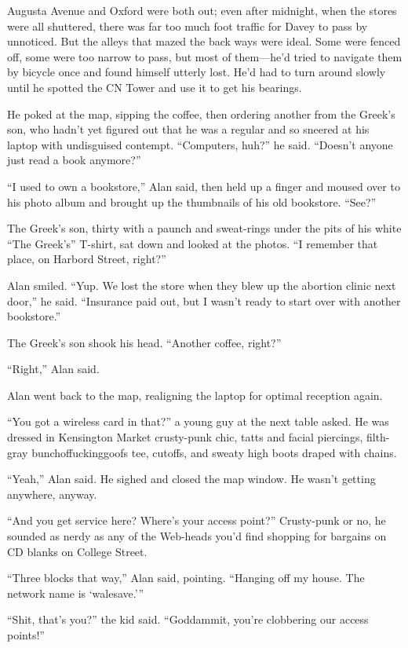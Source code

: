 Augusta Avenue and Oxford were both out; even after midnight, when the
stores were all shuttered, there was far too much foot traffic for
Davey to pass by unnoticed.  But the alleys that mazed the back ways
were ideal.  Some were fenced off, some were too narrow to pass, but
most of them---he'd tried to navigate them by bicycle once and found
himself utterly lost.  He'd had to turn around slowly until he spotted
the CN Tower and use it to get his bearings.

He poked at the map, sipping the coffee, then ordering another from
the Greek's son, who hadn't yet figured out that he was a regular and
so sneered at his laptop with undisguised contempt.  ``Computers,
huh?'' he said.  ``Doesn't anyone just read a book anymore?''

``I used to own a bookstore,'' Alan said, then held up a finger and
moused over to his photo album and brought up the thumbnails of his
old bookstore.  ``See?''

The Greek's son, thirty with a paunch and sweat-rings under the pits
of his white ``The Greek's'' T-shirt, sat down and looked at the
photos.  ``I remember that place, on Harbord Street, right?''

Alan smiled.  ``Yup.  We lost the store when they blew up the abortion
clinic next door,'' he said.  ``Insurance paid out, but I wasn't ready
to start over with another bookstore.''

The Greek's son shook his head.  ``Another coffee, right?''

``Right,'' Alan said.

Alan went back to the map, realigning the laptop for optimal reception
again.

``You got a wireless card in that?'' a young guy at the next table
asked.  He was dressed in Kensington Market crusty-punk chic, tatts
and facial piercings, filth-gray bunchoffuckinggoofs tee, cutoffs, and
sweaty high boots draped with chains.

``Yeah,'' Alan said.  He sighed and closed the map window.  He wasn't
getting anywhere, anyway.

``And you get service here?  Where's your access point?'' Crusty-punk
or no, he sounded as nerdy as any of the Web-heads you'd find shopping
for bargains on CD blanks on College Street.

``Three blocks that way,'' Alan said, pointing.  ``Hanging off my
house.  The network name is `walesave.'''

``Shit, that's you?'' the kid said.  ``Goddammit, you're clobbering
our access points!''

